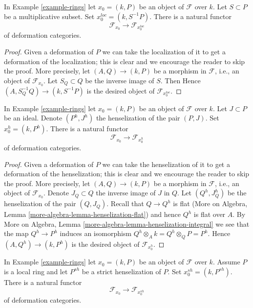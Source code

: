 \begin{lemma}
\label{lemma-localization}
In Example \ref{example-rings} let $x_0 = (k, P)$ be an object
of $\mathcal{F}$ over $k$. Let $S \subset P$ be a multiplicative
subset. Set $x_0^{loc} = (k, S^{-1}P)$. There is a natural functor
$$
\mathcal{F}_{x_0} \longrightarrow \mathcal{F}_{x_0^{loc}}
$$
of deformation categories.
\end{lemma}

\begin{proof}
Given a deformation of $P$ we can take the localization
of it to get a deformation of the localization; this is
clear and we encourage the reader to skip the proof. More precisely,
let $(A, Q) \to (k, P)$ be a morphism in $\mathcal{F}$, i.e.,
an object of $\mathcal{F}_{x_0}$. Let $S_Q \subset Q$ be the
inverse image of $S$. Then
Hence $(A, S_Q^{-1}Q) \to (k, S^{-1}P)$
is the desired object of $\mathcal{F}_{x_0^{loc}}$.
\end{proof}

\begin{lemma}
\label{lemma-henselization}
In Example \ref{example-rings} let $x_0 = (k, P)$ be an object
of $\mathcal{F}$ over $k$. Let $J \subset P$ be an ideal.
Denote $(P^h, J^h)$ the henselization of the pair $(P, J)$.
Set $x_0^h = (k, P^h)$. There is a natural functor
$$
\mathcal{F}_{x_0} \longrightarrow \mathcal{F}_{x_0^h}
$$
of deformation categories.
\end{lemma}

\begin{proof}
Given a deformation of $P$ we can take the henselization
of it to get a deformation of the henselization; this is
clear and we encourage the reader to skip the proof. More precisely,
let $(A, Q) \to (k, P)$ be a morphism in $\mathcal{F}$, i.e.,
an object of $\mathcal{F}_{x_0}$. Denote $J_Q \subset Q$ the inverse
image of $J$ in $Q$. Let $(Q^h, J_Q^h)$ be the henselization of
the pair $(Q, J_Q)$. Recall that $Q \to Q^h$ is flat
(More on Algebra, Lemma \ref{more-algebra-lemma-henselization-flat})
and hence $Q^h$ is flat over $A$.
By More on Algebra, Lemma \ref{more-algebra-lemma-henselization-integral}
we see that the map $Q^h \to P^h$ induces an isomorphism
$Q^h \otimes_A k = Q^h \otimes_Q P = P^h$.
Hence $(A, Q^h) \to (k, P^h)$ is the desired object of
$\mathcal{F}_{x_0^h}$.
\end{proof}

\begin{lemma}
\label{lemma-strict-henselization}
In Example \ref{example-rings} let $x_0 = (k, P)$ be an object
of $\mathcal{F}$ over $k$. Assume $P$ is a local ring and let
$P^{sh}$ be a strict henselization of $P$.
Set $x_0^{sh} = (k, P^{sh})$. There is a natural functor
$$
\mathcal{F}_{x_0} \longrightarrow \mathcal{F}_{x_0^{sh}}
$$
of deformation categories.
\end{lemma}

